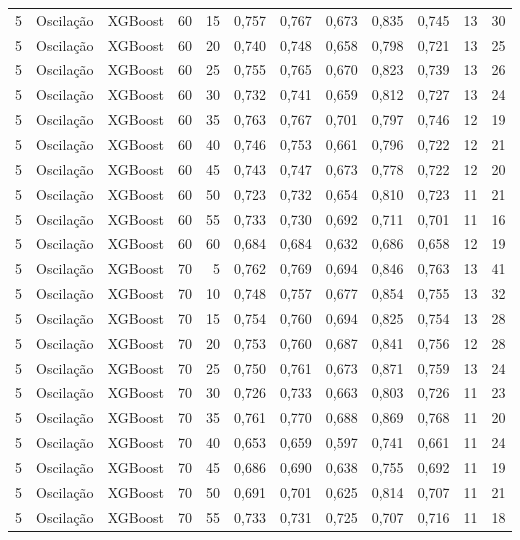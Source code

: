 \begin{longtable}{@{}rllrrrrrrrrr@{}}
5 & Oscilação & XGBoost & 60 & 15 & 0,757 & 0,767 & 0,673 & 0,835 & 0,745 & 13 & 30 \\
5 & Oscilação & XGBoost & 60 & 20 & 0,740 & 0,748 & 0,658 & 0,798 & 0,721 & 13 & 25 \\
5 & Oscilação & XGBoost & 60 & 25 & 0,755 & 0,765 & 0,670 & 0,823 & 0,739 & 13 & 26 \\
5 & Oscilação & XGBoost & 60 & 30 & 0,732 & 0,741 & 0,659 & 0,812 & 0,727 & 13 & 24 \\
5 & Oscilação & XGBoost & 60 & 35 & 0,763 & 0,767 & 0,701 & 0,797 & 0,746 & 12 & 19 \\
5 & Oscilação & XGBoost & 60 & 40 & 0,746 & 0,753 & 0,661 & 0,796 & 0,722 & 12 & 21 \\
5 & Oscilação & XGBoost & 60 & 45 & 0,743 & 0,747 & 0,673 & 0,778 & 0,722 & 12 & 20 \\
5 & Oscilação & XGBoost & 60 & 50 & 0,723 & 0,732 & 0,654 & 0,810 & 0,723 & 11 & 21 \\
5 & Oscilação & XGBoost & 60 & 55 & 0,733 & 0,730 & 0,692 & 0,711 & 0,701 & 11 & 16 \\
5 & Oscilação & XGBoost & 60 & 60 & 0,684 & 0,684 & 0,632 & 0,686 & 0,658 & 12 & 19 \\
5 & Oscilação & XGBoost & 70 & 5 & 0,762 & 0,769 & 0,694 & 0,846 & 0,763 & 13 & 41 \\
5 & Oscilação & XGBoost & 70 & 10 & 0,748 & 0,757 & 0,677 & 0,854 & 0,755 & 13 & 32 \\
5 & Oscilação & XGBoost & 70 & 15 & 0,754 & 0,760 & 0,694 & 0,825 & 0,754 & 13 & 28 \\
5 & Oscilação & XGBoost & 70 & 20 & 0,753 & 0,760 & 0,687 & 0,841 & 0,756 & 12 & 28 \\
5 & Oscilação & XGBoost & 70 & 25 & 0,750 & 0,761 & 0,673 & 0,871 & 0,759 & 13 & 24 \\
5 & Oscilação & XGBoost & 70 & 30 & 0,726 & 0,733 & 0,663 & 0,803 & 0,726 & 11 & 23 \\
5 & Oscilação & XGBoost & 70 & 35 & 0,761 & 0,770 & 0,688 & 0,869 & 0,768 & 11 & 20 \\
5 & Oscilação & XGBoost & 70 & 40 & 0,653 & 0,659 & 0,597 & 0,741 & 0,661 & 11 & 24 \\
5 & Oscilação & XGBoost & 70 & 45 & 0,686 & 0,690 & 0,638 & 0,755 & 0,692 & 11 & 19 \\
5 & Oscilação & XGBoost & 70 & 50 & 0,691 & 0,701 & 0,625 & 0,814 & 0,707 & 11 & 21 \\
5 & Oscilação & XGBoost & 70 & 55 & 0,733 & 0,731 & 0,725 & 0,707 & 0,716 & 11 & 18 \\

\end{longtable}
